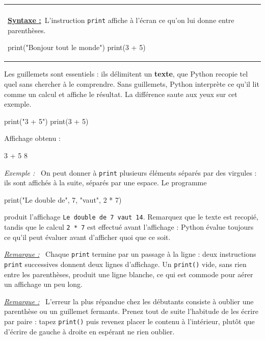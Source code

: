 \documentclass[a4paper,11pt,openany]{book}
\makeatletter
\newcommand{\mot}[1]{\textcolor{rougecours}{\textbf{#1}}}
\newcommand{\code}[1]{\texttt{\textcolor{codebleu}{#1}}}
\newenvironment{cadre}%
 {\par\vspace{2mm}\noindent\begin{tabular}{|@{\hspace{4mm}}p{0.93\textwidth}@{\hspace{4mm}}|}
  \hline \\[-2mm]}%
 {\\[2mm] \hline \end{tabular}\par\vspace{3mm}}
\newcommand{\syntaxe}{\textbf{\underline{Syntaxe :}}~}
\newenvironment{exemple}%
 {\par\vspace{1mm}\begin{list}{}{\leftmargin=1cm \rightmargin=0.5cm}\item[]%
  \textit{Exemple :}~}%
 {\end{list}\vspace{1mm}}
\newenvironment{remarque}%
 {\par\vspace{1mm}\begin{list}{}{\leftmargin=1cm \rightmargin=0.5cm}\item[]%
  \textit{\underline{Remarque :}}~}%
 {\end{list}\vspace{1mm}}
\makeatother
\begin{document}
\begin{cadre}
\syntaxe L'instruction \code{print} affiche à l'écran ce qu'on lui donne entre parenthèses.
\begin{python}
print("Bonjour tout le monde")
print(3 + 5)
\end{python}
\end{cadre}

Les guillemets sont essentiels : ils délimitent un \mot{texte}, que Python recopie tel quel sans chercher à le comprendre. Sans guillemets, Python interprète ce qu'il lit comme un calcul et affiche le résultat. La différence saute aux yeux sur cet exemple.

\begin{python}
print("3 + 5")
print(3 + 5)
\end{python}

Affichage obtenu :

\begin{sortie}
3 + 5
8
\end{sortie}

\begin{exemple}
On peut donner à \code{print} plusieurs éléments séparés par des virgules : ils sont affichés à la suite, séparés par une espace. Le programme
\begin{python}
print("Le double de", 7, "vaut", 2 * 7)
\end{python}
produit l'affichage \code{Le double de 7 vaut 14}. Remarquez que le texte est recopié, tandis que le calcul \code{2 * 7} est effectué avant l'affichage : Python évalue toujours ce qu'il peut évaluer avant d'afficher quoi que ce soit.
\end{exemple}

\begin{remarque}
Chaque \code{print} termine par un passage à la ligne : deux instructions \code{print} successives donnent deux lignes d'affichage. Un \code{print()} vide, sans rien entre les parenthèses, produit une ligne blanche, ce qui est commode pour aérer un affichage un peu long.
\end{remarque}

\begin{remarque}
L'erreur la plus répandue chez les débutants consiste à oublier une parenthèse ou un guillemet fermants. Prenez tout de suite l'habitude de les écrire par paire : tapez \code{print()} puis revenez placer le contenu à l'intérieur, plutôt que d'écrire de gauche à droite en espérant ne rien oublier.
\end{remarque}
\end{document}
